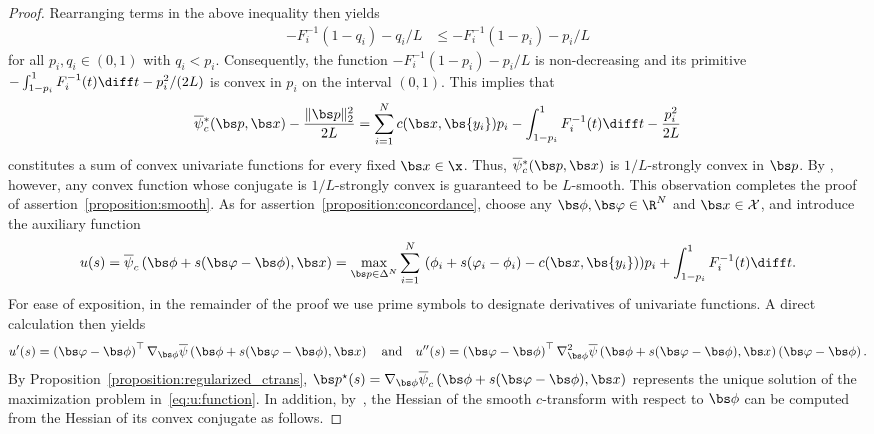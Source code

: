 \documentclass[11pt, a4paper, oneside, reqno]{article}
\begin{document}
\begin{proof}
		Rearranging terms in the above inequality then yields
		\begin{align*} 
		    -F_i^{-1}(1 - q_i) - q_i/L &\leq  -F_i^{-1}(1-p_i)-p_i/L
		\end{align*}
		for all $p_i, q_i \in (0, 1)$ with $q_i < p_i$. Consequently, the function $- F_i^{-1}(1-p_i) - {p_i}/L$ is non-decreasing and its primitive $- \int_{1-p_i}^1 F_i^{-1}(t)\diff t - p_i^2/(2 L)$ is convex in $p_i$ on the interval $(0,1)$. This implies that
		$$ \overline\psi{}_c^*(\bs p, \bs x) -  \frac{\| \bs p\|_2^2}{2 L} = \sum_{i=1}^N c(\bs x, \bs {y_i}) p_i - \int_{1-p_i}^1 F_i^{-1}(t)\diff t - \frac{p_i^2}{2 L}$$
		constitutes a sum of convex univariate functions for every fixed $\bs x\in \x$. Thus, $\overline\psi{}_c^*(\bs p, \bs x)$ is $1/L$-strongly convex in $\bs p$. By \citep[Theorem~6]{kakade2009duality}, however, any convex function whose conjugate is $1/L$-strongly convex is guaranteed to be $L$-smooth. This observation completes the proof of assertion~\ref{proposition:smooth}. As for assertion~\ref{proposition:concordance}, choose any $\bs \phi, \bs \varphi \in \R^N$ and $\bs x \in \mathcal X$, and introduce the auxiliary function
		\begin{equation}
		\label{eq:u:function}
		    u(s) = \overline \psi_c \left(\bs \phi + s (\bs \varphi - \bs \phi), \bs x \right) = \max_{ \bs p \in \Delta^N} \displaystyle \sum\limits_{i=1}^N ~ (\phi_i + s (\varphi_i - \phi_i) - c(\bs x, \bs {y_i}))p_i + \int_{1-p_i}^1 F_i^{-1}(t) \diff t.
		\end{equation}
		For ease of exposition, in the remainder of the proof we use prime symbols to designate derivatives of univariate functions. A direct calculation then yields
		\begin{align*}
		    u'(s) = \left( \bs \varphi - \bs \phi \right)^\top \nabla_{\bs \phi} \overline \psi \left(\bs \phi + s (\bs \varphi - \bs \phi), \bs x \right) \quad \text{and} \quad u''(s) = \left( \bs \varphi - \bs \phi \right)^\top \nabla_{\bs \phi}^2 \overline \psi \left(\bs \phi + s (\bs \varphi - \bs \phi), \bs x \right) \left( \bs \varphi - \bs \phi \right).
		\end{align*}
		By Proposition~\ref{proposition:regularized_ctrans}, $\bs p^\star(s)=\nabla_{\bs \phi} \overline \psi_c \left(\bs \phi + s (\bs \varphi - \bs \phi), \bs x \right)$ represents the unique solution of the maximization problem in~\eqref{eq:u:function}. In addition, by~\citep[Proposition~6]{sun2019generalized}, the Hessian of the smooth $c$-transform with respect to $\bs \phi$ can be computed from the Hessian of its convex conjugate as follows.

\end{proof}
\end{document}

